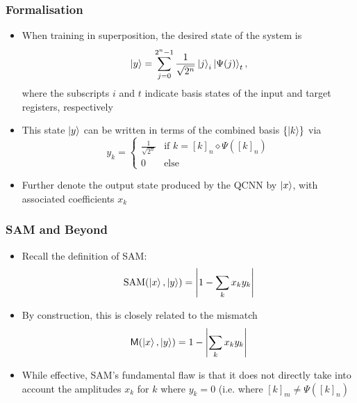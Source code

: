 \documentclass{beamer}
\begin{document}
\begin{frame}
\frametitle{Formalisation}
\begin{itemize}
\item When training in superposition, the \alert{desired state} of the system is 
\begin{equation}
\ket{y} = \sum_{j=0}^{2^n-1} \frac{1}{\sqrt{2^n}} \ket{j}_i \ket{\Psi(j)}_t,
\end{equation}
where the subscripts $i$ and $t$ indicate basis states of the input and target registers, respectively
\item This state $\ket{y}$ can be written in terms of the \alert{combined basis} $\{ \ket{k} \}$ via 
\begin{equation}
y_k = \begin{cases}
\frac{1}{\sqrt{2^n}}  & \text{if } k=[k]_n \diamond \Psi([k]_n) \\
0 & \text{else} 
\end{cases}
\end{equation}
\item Further denote the \alert{output state} produced by the QCNN by $\ket{x}$, with associated coefficients $x_k$
\end{itemize}
\end{frame}

\begin{frame}
\frametitle{SAM and Beyond}
\begin{itemize}
\item Recall the definition of \alert{SAM}:
\begin{equation}
\text{SAM}(\ket{x}, \ket{y}) = \left\vert 1 - \sum_k x_k y_k \right\vert 
\end{equation}
\item By construction, this is closely related to the \alert{mismatch} 
\begin{equation}
\mathsf{M}(\ket{x}, \ket{y}) = 1 - \left|\sum_k x_k y_k\right|
\end{equation}
\item While effective, SAM's \alert{fundamental flaw} is that it does not directly take into account the amplitudes $x_k$ for $k$ where $y_k =0$ (i.e. where $[k]_m \neq \Psi([k]_n)$
\end{itemize}
\end{frame}
\end{document}
